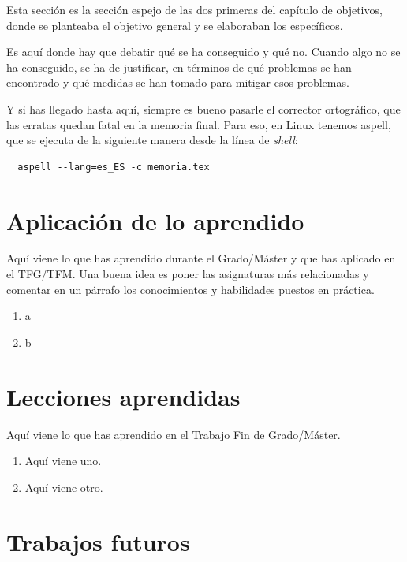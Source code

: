 \documentclass[a4paper, 12pt]{book}
\begin{document}
Esta sección es la sección espejo de las dos primeras del capítulo de objetivos, donde se planteaba el objetivo general y se elaboraban los específicos.

Es aquí donde hay que debatir qué se ha conseguido y qué no. 
Cuando algo no se ha conseguido, se ha de justificar, en términos de qué problemas se han encontrado y qué medidas se han tomado para mitigar esos problemas.

Y si has llegado hasta aquí, siempre es bueno pasarle el corrector ortográfico, que las erratas quedan fatal en la memoria final.
Para eso, en Linux tenemos aspell, que se ejecuta de la siguiente manera desde la línea de \emph{shell}:

\begin{verbatim}
  aspell --lang=es_ES -c memoria.tex
\end{verbatim}

\section{Aplicación de lo aprendido}
\label{sec:aplicacion}

Aquí viene lo que has aprendido durante el Grado/Máster y que has aplicado en el TFG/TFM.
Una buena idea es poner las asignaturas más relacionadas y comentar en un párrafo los conocimientos y habilidades puestos en práctica.

\begin{enumerate}
  \item a
  \item b
\end{enumerate}


\section{Lecciones aprendidas}
\label{sec:lecciones_aprendidas}

Aquí viene lo que has aprendido en el Trabajo Fin de Grado/Máster.

\begin{enumerate}
  \item Aquí viene uno.
  \item Aquí viene otro.
\end{enumerate}


\section{Trabajos futuros}
\label{sec:trabajos_futuros}
\end{document}
